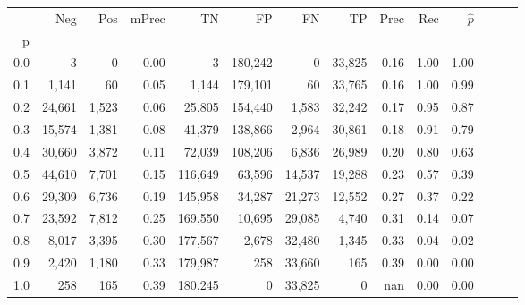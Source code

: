 \begin{tabular}{rrrrrrrrrrrrrr}
\toprule
{} &     Neg &    Pos & mPrec &       TN &       FP &      FN &      TP &  Prec &   Rec & $\hat{p}$ \\
p   &         &        &       &          &          &         &         &       &       &           \\
\midrule
0.0 &       3 &      0 &  0.00 &        3 &  180,242 &       0 &  33,825 &  0.16 &  1.00 &      1.00 \\
0.1 &   1,141 &     60 &  0.05 &    1,144 &  179,101 &      60 &  33,765 &  0.16 &  1.00 &      0.99 \\
0.2 &  24,661 &  1,523 &  0.06 &   25,805 &  154,440 &   1,583 &  32,242 &  0.17 &  0.95 &      0.87 \\
0.3 &  15,574 &  1,381 &  0.08 &   41,379 &  138,866 &   2,964 &  30,861 &  0.18 &  0.91 &      0.79 \\
0.4 &  30,660 &  3,872 &  0.11 &   72,039 &  108,206 &   6,836 &  26,989 &  0.20 &  0.80 &      0.63 \\
0.5 &  44,610 &  7,701 &  0.15 &  116,649 &   63,596 &  14,537 &  19,288 &  0.23 &  0.57 &      0.39 \\
0.6 &  29,309 &  6,736 &  0.19 &  145,958 &   34,287 &  21,273 &  12,552 &  0.27 &  0.37 &      0.22 \\
0.7 &  23,592 &  7,812 &  0.25 &  169,550 &   10,695 &  29,085 &   4,740 &  0.31 &  0.14 &      0.07 \\
0.8 &   8,017 &  3,395 &  0.30 &  177,567 &    2,678 &  32,480 &   1,345 &  0.33 &  0.04 &      0.02 \\
0.9 &   2,420 &  1,180 &  0.33 &  179,987 &      258 &  33,660 &     165 &  0.39 &  0.00 &      0.00 \\
1.0 &     258 &    165 &  0.39 &  180,245 &        0 &  33,825 &       0 &   nan &  0.00 &      0.00 \\
\bottomrule
\end{tabular}
